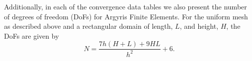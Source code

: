Additionally, in each of the convergence data tables we also present the number of degrees of freedom (DoFs) for Argyris
Finite Elements. For the uniform mesh as described above and a rectangular domain of length, $L$, and height, $H$, the
DoFs are given by
\begin{equation*}
  N = \frac{7h\left(H + L\right) + 9 H L}{h^2} + 6.
\end{equation*}

